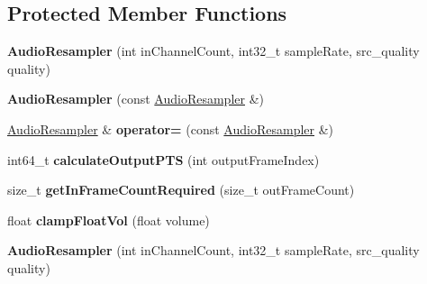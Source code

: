\subsection*{Protected Member Functions}
\begin{DoxyCompactItemize}
\item 
\mbox{\label{classcocos2d_1_1experimental_1_1AudioResampler_ac8a25d2c82f5155ea2b8433b02ffd65f}} 
{\bfseries Audio\+Resampler} (int in\+Channel\+Count, int32\+\_\+t sample\+Rate, src\+\_\+quality quality)
\item 
\mbox{\label{classcocos2d_1_1experimental_1_1AudioResampler_a54d6009b8aa78ac614b5bac167b88c7f}} 
{\bfseries Audio\+Resampler} (const \hyperlink{classcocos2d_1_1experimental_1_1AudioResampler}{Audio\+Resampler} \&)
\item 
\mbox{\label{classcocos2d_1_1experimental_1_1AudioResampler_a07a498dfa1586c3a8a88ce6b051082e0}} 
\hyperlink{classcocos2d_1_1experimental_1_1AudioResampler}{Audio\+Resampler} \& {\bfseries operator=} (const \hyperlink{classcocos2d_1_1experimental_1_1AudioResampler}{Audio\+Resampler} \&)
\item 
\mbox{\label{classcocos2d_1_1experimental_1_1AudioResampler_adb4b4035bcae0d44f243f0f5b6ebd520}} 
int64\+\_\+t {\bfseries calculate\+Output\+P\+TS} (int output\+Frame\+Index)
\item 
\mbox{\label{classcocos2d_1_1experimental_1_1AudioResampler_a46ec293b92dc34c93c3e7e7363ab743b}} 
size\+\_\+t {\bfseries get\+In\+Frame\+Count\+Required} (size\+\_\+t out\+Frame\+Count)
\item 
\mbox{\label{classcocos2d_1_1experimental_1_1AudioResampler_af21517b7974d0ba9ea95c78e3de86198}} 
float {\bfseries clamp\+Float\+Vol} (float volume)
\item 
\mbox{\label{classcocos2d_1_1experimental_1_1AudioResampler_ac8a25d2c82f5155ea2b8433b02ffd65f}} 
{\bfseries Audio\+Resampler} (int in\+Channel\+Count, int32\+\_\+t sample\+Rate, src\+\_\+quality quality)

\end{DoxyCompactItemize}
